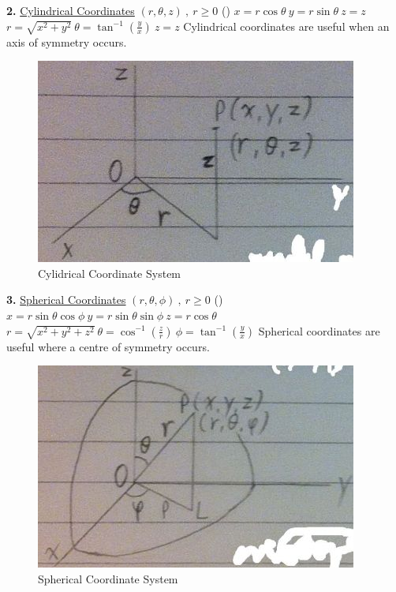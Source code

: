 \documentclass[12pt]{article}
\begin{document}
\begin{flushleft}
	\textbf{2.} \uline{Cylindrical Coordinates} $(r,\theta, z) \ , \ r \geq 0$ () \linebreak 
	$\displaystyle x = r \cos \theta \ y = r \sin \theta \ z = z$ \linebreak 
	$\displaystyle r = \sqrt{x^2 +y^2} \ \theta = \tan ^{-1} (\frac{y}{x}) \ z = z$ \linebreak 
	Cylindrical coordinates are useful when an axis of symmetry occurs. \linebreak 
	
	\begin{figure}[H]
	\centering
	\includegraphics[scale=0.8]{cylindricalCoordinateSystem}
	\caption{Cylidrical Coordinate System}
	\label{fig:cylindricalCoordinateSystem}
	\end{figure}
	
	\textbf{3.} \uline{Spherical Coordinates} $(r,\theta, \phi ) \ , \ r\geq 0$ () \linebreak 
	$\displaystyle x = r \sin \theta \cos \phi \ y = r \sin \theta \sin \phi \ z = r \cos \theta $ \linebreak 
	$\displaystyle r = \sqrt{x^2 +y^2 +z^2} \ \theta = \cos ^{-1} \left(\frac{z}{r}\right) \ \phi = \tan ^{-1} \left( \frac{y}{x} \right)  $ \linebreak 
	Spherical coordinates are useful where a centre of symmetry occurs. \linebreak 
	
	\begin{figure}[H]
	\centering
	\includegraphics[scale=0.8]{sphericalCoordinateSystem}
	\caption{Spherical Coordinate System}
	\label{fig:sphericalCoordinateSystem}
	\end{figure}
	

\end{flushleft}
\end{document}
